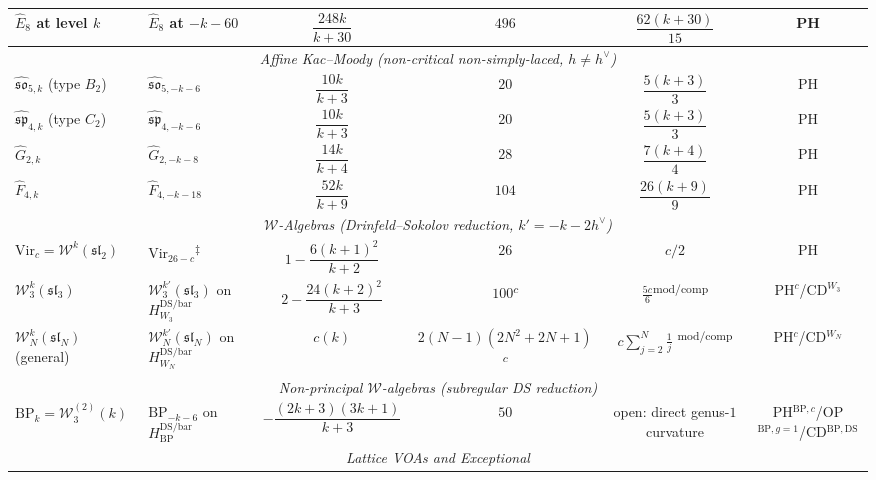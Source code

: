 \begin{table}[ht]
{{\begin{tabular}{|l|l|c|c|c|c|}
\hline
$\widehat{E}_8$ at level $k$
 & $\widehat{E}_8$ at $-k{-}60$
 & $\dfrac{248k}{k+30}$ & $496$ & $\dfrac{62(k+30)}{15}$ & PH \\[4pt]
\hline
\multicolumn{6}{|c|}{\textit{Affine Kac--Moody \textup{(}non-critical non-simply-laced, $h \neq h^\vee$\textup{)}}} \\
\hline
$\widehat{\mathfrak{so}}_{5,k}$ (type $B_2$)
 & $\widehat{\mathfrak{so}}_{5,-k-6}$
 & $\dfrac{10k}{k+3}$ & $20$ & $\dfrac{5(k+3)}{3}$ & PH \\[4pt]
\hline
$\widehat{\mathfrak{sp}}_{4,k}$ (type $C_2$)
 & $\widehat{\mathfrak{sp}}_{4,-k-6}$
 & $\dfrac{10k}{k+3}$ & $20$ & $\dfrac{5(k+3)}{3}$ & PH \\[4pt]
\hline
$\widehat{G}_{2,k}$
 & $\widehat{G}_{2,-k-8}$
 & $\dfrac{14k}{k+4}$ & $28$ & $\dfrac{7(k+4)}{4}$ & PH \\[4pt]
\hline
$\widehat{F}_{4,k}$
 & $\widehat{F}_{4,-k-18}$
 & $\dfrac{52k}{k+9}$ & $104$ & $\dfrac{26(k+9)}{9}$ & PH \\[4pt]
\hline
\multicolumn{6}{|c|}{\textit{$\mathcal{W}$-Algebras
 \textup{(}Drinfeld--Sokolov reduction, $k' = -k - 2h^\vee$\textup{)}}} \\
\hline
$\mathrm{Vir}_c = \mathcal{W}^k(\mathfrak{sl}_2)$
 & $\mathrm{Vir}_{26-c}$\textsuperscript{$\ddagger$}
 & $1 - \dfrac{6(k{+}1)^2}{k{+}2}$ & $26$ & $c/2$ & PH \\[4pt]
\hline
$\mathcal{W}_3^k(\mathfrak{sl}_3)$
 & $\mathcal{W}_3^{k'}(\mathfrak{sl}_3)$ on
 $H_{W_3}^{\mathrm{DS/bar}}$
 & $2 - \dfrac{24(k{+}2)^2}{k{+}3}$ & $100$\textsuperscript{$c$}
 & $\tfrac{5c}{6}$\textsuperscript{$\mathrm{mod/comp}$}
 & PH$^c$/CD$^{W_3}$ \\[4pt]
\hline
$\mathcal{W}_N^k(\mathfrak{sl}_N)$ (general)
 & $\mathcal{W}_N^{k'}(\mathfrak{sl}_N)$ on
 $H_{W_N}^{\mathrm{DS/bar}}$
 & $c(k)$ & $2(N{-}1)(2N^2{+}2N{+}1)$
 \textsuperscript{$c$}
 & $c \displaystyle\sum_{j=2}^{N}\tfrac{1}{j}$
 \textsuperscript{$\mathrm{mod/comp}$}
 & PH$^c$/CD$^{W_N}$ \\[6pt]
\hline
\multicolumn{6}{|c|}{\textit{Non-principal $\mathcal{W}$-algebras
 \textup{(}subregular DS reduction\textup{)}}} \\
\hline
$\mathrm{BP}_k = \mathcal{W}_3^{(2)}(k)$
 & $\mathrm{BP}_{-k-6}$ on $H_{\mathrm{BP}}^{\mathrm{DS/bar}}$
 & $-\dfrac{(2k{+}3)(3k{+}1)}{k{+}3}$ & $50$
 & open: direct genus-$1$ curvature
 & PH$^{\mathrm{BP},c}$/OP$^{\mathrm{BP},g=1}$/CD$^{\mathrm{BP,DS}}$ \\[4pt]
\hline
\multicolumn{6}{|c|}{\textit{Lattice VOAs and Exceptional}} \\

\end{tabular}}}
\end{table}
